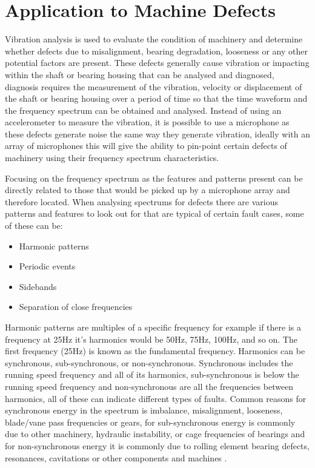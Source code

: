 \documentclass{UoNMCHA}
\numberwithin{equation}{section}
\begin{document}
\newpage
\section{Application to Machine Defects} \label{sec:Machine Defects}

Vibration analysis is used to evaluate the condition of machinery and determine whether defects due to misalignment, bearing degradation, looseness or any other potential factors are present. These defects generally cause vibration or impacting within the shaft or bearing housing that can be analysed and diagnosed, diagnosis requires the measurement of the vibration, velocity or displacement of the shaft or bearing housing over a period of time so that the time waveform and the frequency spectrum can be obtained and analysed. Instead of using an accelerometer to measure the vibration, it is possible to use a microphone as these defects generate noise the same way they generate vibration, ideally with an array of microphones this will give the ability to pin-point certain defects of machinery using their frequency spectrum characteristics.

Focusing on the frequency spectrum as the features and patterns present can be directly related to those that would be picked up by a microphone array and therefore located. When analysing spectrums for defects there are various patterns and features to look out for that are typical of certain fault cases, some of these can be:

\begin{itemize}
    \item Harmonic patterns
    \item Periodic events
    \item Sidebands
    \item Separation of close frequencies
\end{itemize}

Harmonic patterns are multiples of a specific frequency for example if there is a frequency at 25Hz it's harmonics would be 50Hz, 75Hz, 100Hz, and so on. The first frequency (25Hz) is known as the fundamental frequency.
Harmonics can be synchronous, sub-synchronous, or non-synchronous. Synchronous includes the running speed frequency and all of its harmonics, sub-synchronous is below the running speed frequency and non-synchronous are all the frequencies between harmonics, all of these can indicate different types of faults. Common reasons for synchronous energy in the spectrum is imbalance, misalignment, looseness, blade/vane pass frequencies or gears, for sub-synchronous energy is commonly due to other machinery, hydraulic instability, or cage frequencies of bearings and for non-synchronous energy it is commonly due to rolling element bearing defects, resonances, cavitations or other components and machines \citep{Mob20}.
\end{document}
